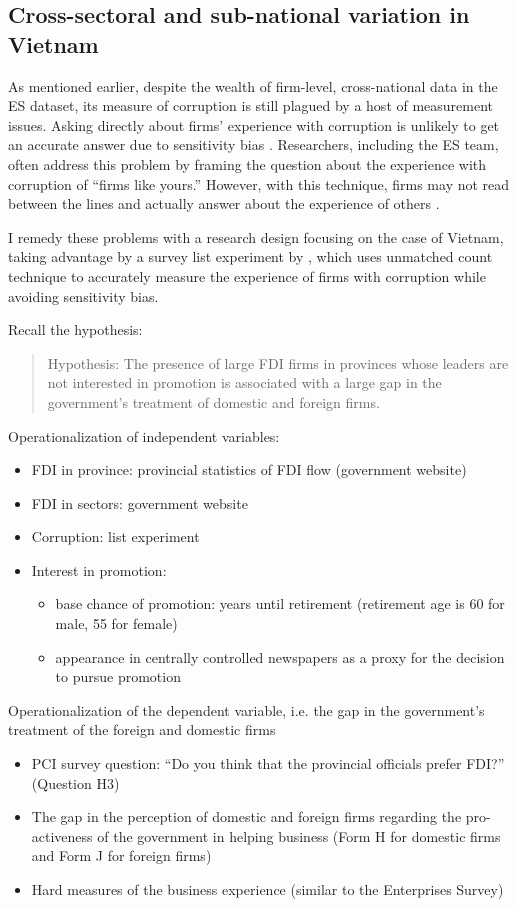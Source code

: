 \subsection{Cross-sectoral and sub-national variation in Vietnam}

As mentioned earlier, despite the wealth of firm-level, cross-national data in the ES dataset, its measure of corruption is still plagued by a host of measurement issues. Asking directly about firms' experience with corruption is unlikely to get an accurate answer due to sensitivity bias \citep{Coutts2011}. Researchers, including the ES team, often address this problem by framing the question about the experience with corruption of ``firms like yours.'' However, with this technique, firms may not read between the lines and actually answer about the experience of others \citep{Ahart2004}.

I remedy these problems with a research design focusing on the case of Vietnam, taking advantage by a survey list experiment by \citet{Malesky2015}, which uses unmatched count technique to accurately measure the experience of firms with corruption while avoiding sensitivity bias.

Recall the hypothesis:

\begin{quote}
Hypothesis: The presence of large FDI firms in provinces whose leaders are not interested in promotion is associated with a large gap in the government's treatment of domestic and foreign firms.
\end{quote}

Operationalization of independent variables:
\begin{itemize}
\item FDI in province: provincial statistics of FDI flow (government website)
\item FDI in sectors: government website
\item Corruption: list experiment \citep{Malesky2015}
\item Interest in promotion: 
\begin{itemize}
	\item base chance of promotion: years until retirement (retirement age is 60 for male, 55 for female)
	\item appearance in centrally controlled newspapers as a proxy for the decision to pursue promotion
\end{itemize}
\end{itemize}

Operationalization of the dependent variable, i.e. the gap in the government's treatment of the foreign and domestic firms
\begin{itemize}
	\item PCI survey question: ``Do you think that the provincial officials prefer FDI?'' (Question H3)
	\item The gap in the perception of domestic and foreign firms regarding the pro-activeness of the government in helping business (Form H for domestic firms and Form J for foreign firms)
	\item Hard measures of the business experience (similar to the Enterprises Survey)
\end{itemize}

